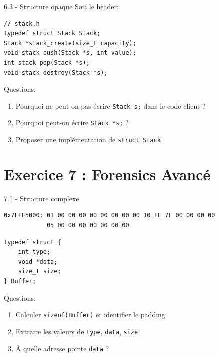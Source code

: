 \documentclass[10pt,a4paper]{article}
\begin{document}
\begin{exercicebox}{6.3 - Structure opaque}
Soit le header:
\begin{lstlisting}
// stack.h
typedef struct Stack Stack;
Stack *stack_create(size_t capacity);
void stack_push(Stack *s, int value);
int stack_pop(Stack *s);
void stack_destroy(Stack *s);
\end{lstlisting}

Questions:
\begin{enumerate}
\item Pourquoi ne peut-on pas écrire \texttt{Stack s;} dans le code client ?
\item Pourquoi peut-on écrire \texttt{Stack *s;} ?
\item Proposer une implémentation de \texttt{struct Stack}
\end{enumerate}
\end{exercicebox}

\section{Exercice 7 : Forensics Avancé}

\begin{exercicebox}{7.1 - Structure complexe}
\begin{verbatim}
0x7FFE5000: 01 00 00 00 00 00 00 00 00 10 FE 7F 00 00 00 00
            05 00 00 00 00 00 00 00
\end{verbatim}

\begin{lstlisting}
typedef struct {
    int type;
    void *data;
    size_t size;
} Buffer;
\end{lstlisting}

Questions:
\begin{enumerate}
\item Calculer \texttt{sizeof(Buffer)} et identifier le padding
\item Extraire les valeurs de \texttt{type}, \texttt{data}, \texttt{size}
\item À quelle adresse pointe \texttt{data} ?
\end{enumerate}
\end{exercicebox}
\end{document}

